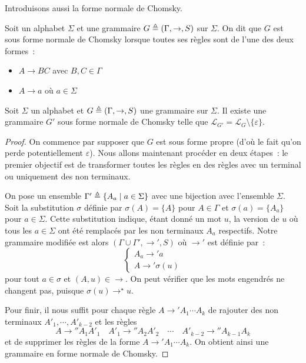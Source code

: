 Introduisons aussi la forme normale de Chomsky.

\begin{definition}
  Soit un alphabet $\Sigma$ et une grammaire $G \triangleq (\Gamma, \to, S)$ sur
  $\Sigma$. On dit que $G$ est sous forme normale de Chomsky lorsque toutes
  ses règles sont de l'une des deux formes~:
  \begin{itemize}
  \item $A \to BC$ avec $B,C\in \Gamma$
  \item $A \to a$ où $a \in \Sigma$
  \end{itemize}
\end{definition}

\begin{proposition}
  Soit $\Sigma$ un alphabet et $G \triangleq (\Gamma,\to,S)$ une grammaire sur
  $\Sigma$.
  Il existe une grammaire $G'$ sous forme normale de Chomsky telle que
  $\mathcal L_{G'} = \mathcal L_G\setminus \{\varepsilon\}$.
\end{proposition}

\begin{proof}
  On commence par supposer que $G$ est sous forme propre (d'où le fait qu'on
  perde potentiellement $\varepsilon$). Nous allons maintenant procéder en deux
  étapes~: le premier objectif est de transformer toutes les règles en des
  règles avec un terminal ou uniquement des non terminaux.

  On pose un ensemble $\Gamma' \triangleq \{A_a\mid a \in \Sigma\}$ avec une
  bijection avec l'ensemble $\Sigma$. Soit la substitution $\sigma$ définie par
  $\sigma(A) = \{A\}$ pour $A \in \Gamma$ et $\sigma(a) = \{A_a\}$ pour
  $a \in \Sigma$. Cette substitution indique, étant donné un mot $u$, la version
  de $u$ où tous les $a \in \Sigma$ ont été remplacés par les non terminaux
  $A_a$ respectifs.
  Notre grammaire modifiée est alors $(\Gamma\cup\Gamma',\to',S)$ où $\to'$ est
  définie par~:
  \[\begin{cases}
  A_a \to' a\\
  A \to' \sigma(u)
  \end{cases}\]
  pour tout $a \in \sigma$ et $(A,u)\in \to$. On peut vérifier que les mots
  engendrés ne changent pas, puisque $\sigma(u){\to}^\star u$.

  Pour finir, il nous suffit pour chaque règle $A \to' A_1\cdots A_k$ de
  rajouter des non terminaux $A'_1,\cdots,A'_{k-2}$ et les règles
  \[A \to'' A_1 A'_1\quad A'_1 \to'' A_2 A'_2 \quad\cdots
  \quad A'_{k-2} \to'' A_{k-1}A_k\]
  et de supprimer les règles de la forme $A \to' A_1\cdots A_k$. On obtient
  ainsi une grammaire en forme normale de Chomsky.
\end{proof}

